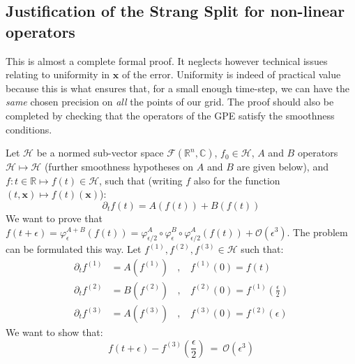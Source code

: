 \documentclass{article}
\begin{document}
\subsection*{Justification of the Strang Split for non-linear operators}

This is almost a complete formal proof. It neglects however technical issues relating to uniformity in $\mathbf{x}$ of the error. Uniformity is indeed of practical value because this is what ensures that, for a small enough time-step, we can have the \textit{same} chosen precision on \textit{all} the points of our grid. The proof should also be completed by checking that the operators of the GPE satisfy the smoothness conditions.

\bigskip
Let $\mathcal{H}$ be a normed sub-vector space $\mathcal{F}(\mathbb{R}^n,\mathbb{C})$, $f_0\in \mathcal{H}$, $A$ and $B$ operators $\mathcal{H} \longmapsto \mathcal{H}$ (further smoothness hypotheses on $A$ and $B$ are given below), and $f:t\in \mathbb{R} \longmapsto f(t)\in \mathcal{H}$, such that (writing $f$ also for the function $(t,\mathbf{x}) \longmapsto f(t)(\mathbf{x})$):
\begin{equation}\label{initialEq}
    \partial_t f(t) = A(f(t)) + B(f(t))
\end{equation}
We want to prove that $f(t+\epsilon)=\varphi^{A+B}_{\epsilon}(f(t))=\varphi^A_{\epsilon/2}\circ\varphi^B_{\epsilon}\circ\varphi^A_{\epsilon/2}(f(t))+\mathcal{O}(\epsilon^3)$. The problem can be formulated this way. Let $f^{(1)},f^{(2)},f^{(3)}\in \mathcal{H}$ such that:
\begin{equation}\label{TSM}
\begin{split}
    \partial_t f^{(1)} &= A(f^{(1)})~~~~,~~~~ f^{(1)}(0)=f(t)\\
    \partial_t f^{(2)} &= B(f^{(2)})~~~~,~~~~ f^{(2)}(0)=f^{(1)}(\frac{\epsilon}{2})\\
    \partial_t f^{(3)} &= A(f^{(3)})~~~~,~~~~ f^{(3)}(0)=f^{(2)}(\epsilon)
    \end{split}
\end{equation}
We want to show that:
\begin{equation}\label{Theo}
    f(t+\epsilon)-f^{(3)}(\frac{\epsilon}{2}) ~=~ \mathcal{O}(\epsilon^3)
\end{equation}
\end{document}

